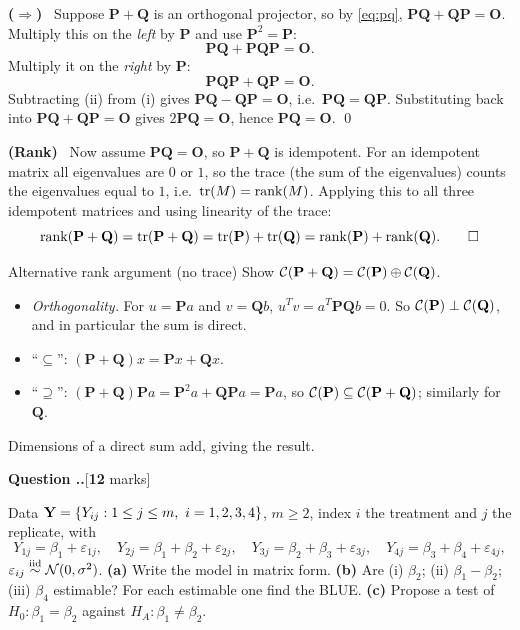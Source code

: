\documentclass[11pt]{article}
\newcounter{qq}[section]
\newcommand{\qhead}[2]{\medskip\refstepcounter{qq}%
  \noindent\textbf{\color{Blue}Question \thesection.\theqq.}\hfill\textnormal{[\textbf{#1} marks]}%
  \ifx\relax#2\relax\else\par\smallskip\fi}
\newcommand{\pt}[1]{\smallskip\noindent\textbf{(#1)}\ }
\begin{document}
\pt{$\Rightarrow$} Suppose $\mathbf{P}+\mathbf{Q}$ is an orthogonal projector, so by
\eqref{eq:pq}, $\mathbf{PQ}+\mathbf{QP}=\mathbf{O}$. Multiply this on the \emph{left} by
$\mathbf{P}$ and use $\mathbf{P}^2=\mathbf{P}$:
\[
  \mathbf{PQ}+\mathbf{PQP}=\mathbf{O}. \tag{i}
\]
Multiply it on the \emph{right} by $\mathbf{P}$:
\[
  \mathbf{PQP}+\mathbf{QP}=\mathbf{O}. \tag{ii}
\]
Subtracting (ii) from (i) gives $\mathbf{PQ}-\mathbf{QP}=\mathbf{O}$, i.e.\
$\mathbf{PQ}=\mathbf{QP}$. Substituting back into $\mathbf{PQ}+\mathbf{QP}=\mathbf{O}$
gives $2\mathbf{PQ}=\mathbf{O}$, hence $\mathbf{PQ}=\mathbf{O}$. \qed

\pt{Rank} Now assume $\mathbf{PQ}=\mathbf{O}$, so $\mathbf{P}+\mathbf{Q}$ is idempotent.
For an idempotent matrix all eigenvalues are $0$ or $1$, so the trace (the sum of the
eigenvalues) counts the eigenvalues equal to $1$, i.e.\ $\operatorname{tr}(M)=\operatorname{rank}(M)$. Applying this to
all three idempotent matrices and using linearity of the trace:
\[
  \operatorname{rank}(\mathbf{P}+\mathbf{Q})=\operatorname{tr}(\mathbf{P}+\mathbf{Q})=\operatorname{tr}(\mathbf{P})+\operatorname{tr}(\mathbf{Q})
  =\operatorname{rank}(\mathbf{P})+\operatorname{rank}(\mathbf{Q}). \qquad\square
\]

\begin{idea}{Alternative rank argument (no trace)}
Show $\mathcal{C}(\mathbf{P}+\mathbf{Q})=\mathcal{C}(\mathbf{P})\oplus\mathcal{C}(\mathbf{Q})$.
\begin{itemize}
  \item \emph{Orthogonality.} For $u=\mathbf{P}a$ and $v=\mathbf{Q}b$,
        $u^Tv=a^T\mathbf{PQ}b=0$. So $\mathcal{C}(\mathbf{P})\perp\mathcal{C}(\mathbf{Q})$, and in
        particular the sum is direct.
  \item ``$\subseteq$'': $(\mathbf{P}+\mathbf{Q})x=\mathbf{P}x+\mathbf{Q}x$.
  \item ``$\supseteq$'': $(\mathbf{P}+\mathbf{Q})\mathbf{P}a
        =\mathbf{P}^2a+\mathbf{QP}a=\mathbf{P}a$, so $\mathcal{C}(\mathbf{P})\subseteq\mathcal{C}(\mathbf{P}+\mathbf{Q})$;
        similarly for $\mathbf{Q}$.
\end{itemize}
Dimensions of a direct sum add, giving the result.
\end{idea}

\qhead{12}{}
\begin{stmt}
Data $\bY=\{Y_{ij}: 1\le j\le m,\ i=1,2,3,4\}$, $m\ge2$, index $i$ the treatment and $j$ the
replicate, with
\[
  Y_{1j}=\beta_1+\varepsilon_{1j},\quad
  Y_{2j}=\beta_1+\beta_2+\varepsilon_{2j},\quad
  Y_{3j}=\beta_2+\beta_3+\varepsilon_{3j},\quad
  Y_{4j}=\beta_3+\beta_4+\varepsilon_{4j},
\]
$\varepsilon_{ij}\overset{\text{iid}}{\sim} \mathcal{N}(0,\sigma^2)$.
\textbf{(a)} Write the model in matrix form.
\textbf{(b)} Are (i) $\beta_2$; (ii) $\beta_1-\beta_2$; (iii) $\beta_4$ estimable? For each
estimable one find the BLUE.
\textbf{(c)} Propose a test of $H_0:\beta_1=\beta_2$ against $H_A:\beta_1\ne\beta_2$.
\end{stmt}
\end{document}
